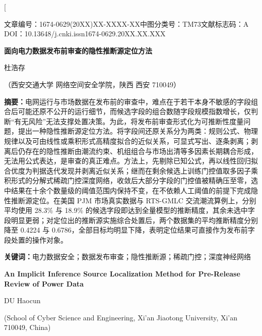 \documentclass[UTF8,zihao=5,twoside]{ctexart}
\newcommand{\articleinfo}{文章编号：1674-0629(20XX)XX-XXXX-XX\quad 中图分类号：TM73\quad 文献标志码：A\\
DOI：10.13648/j.cnki.issn1674-0629.20XX.XX.XXX}
\begin{document}
\twocolumn[

\begin{center}
{\articleinfo}\par\vspace{1.0em}
{\sffamily{}\bfseries 面向电力数据发布前审查的隐性推断源定位方法}\par\vspace{0.8em}
{杜浩存}\par\vspace{0.4em}
{（西安交通大学 网络空间安全学院，陕西 西安 710049）}\par\vspace{0.8em}
\end{center}

\noindent\textbf{摘要：}电网运行与市场数据在发布前的审查中，难点在于若干本身不敏感的字段组合后可能还原不公开的运行细节，而候选字段的组合数随字段规模指数增长，仅判断“有无风险”无法支撑处置决策。为此，将发布前审查形式化为可推断性度量问题，提出一种隐性推断源定位方法。将字段间还原关系分为两类：规则公式、物理规律以及可由线性或乘积形式高精度拟合的近似关系，可显式写出、逐条剥离；剥离后仍存在的隐性推断由潮流约束、机组组合与市场出清等多因素长期耦合形成，无法用公式表达，是审查的真正难点。方法上，先剔除已知公式，再以线性回归拟合优度为判据迭代发现并剥离近似关系；继而在剩余候选上训练门控值取多因子乘积形式的分解式稀疏门控深度网络，收敛后大部分字段的门控值被精确压至零，选中结果在十余个数量级的阈值范围内保持不变，在不依赖人工阈值的前提下完成隐性推断源定位。在美国 PJM 市场真实数据与 RTS-GMLC 交流潮流算例上，分别平均使用 28.3\% 与 18.9\% 的候选字段即达到全量模型的推断精度，其余未选中字段明显更弱；对定位出的推断源实施综合处置后，两个数据集的平均推断精度分别降至 0.4224 与 0.6786，全部目标均明显下降，表明定位结果可直接作为发布前字段处置的操作对象。\par
\noindent\textbf{关键词：}电力数据安全；数据发布审查；隐性推断源；稀疏门控；深度神经网络\par\vspace{0.8em}

\begin{center}
{\bfseries\large An Implicit Inference Source Localization Method for Pre-Release Review of Power Data}\par\vspace{0.5em}
{DU Haocun}\par\vspace{0.3em}
{\small (School of Cyber Science and Engineering, Xi'an Jiaotong University, Xi'an 710049, China)}\par\vspace{0.5em}
\end{center}
\end{document}
